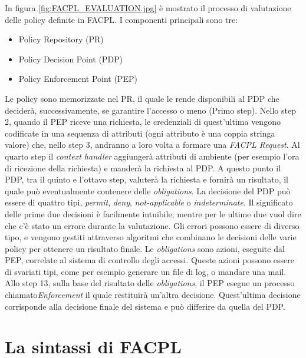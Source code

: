 In figura \ref{fig:FACPL_EVALUATION.jpg} è mostrato il processo di valutazione delle policy definite in FACPL.
I componenti principali sono tre:
\begin{itemize}
\item{Policy Repository (PR)}
\item{Policy Decision Point (PDP)}
\item{Policy Enforcement Point (PEP)}
\end{itemize}
Le policy sono memorizzate nel PR, il quale le rende disponibili al PDP che deciderà, successivamente, se garantire l'accesso o meno (Primo step).
Nello step 2, quando il PEP riceve una richiesta, le credenziali di quest'ultima vengono codificate in una sequenza di attributi (ogni attributo è una coppia stringa valore) che, nello step 3, andranno a loro volta a formare una \textit{FACPL Request}.
Al quarto step il \textit{context handler} aggiungerà attributi di ambiente (per esempio l'ora di ricezione della richiesta) e manderà la richiesta al PDP.
A questo punto il PDP, tra il quinto e l'ottavo step, valuterà la richiesta e fornirà un risultato, il quale può eventualmente contenere delle \textit{obligations}.
La decisione del PDP può essere di quattro tipi, \textit{permit}, \textit{deny}, \textit{not-applicable} o \textit{indeterminate}.
Il significato delle prime due decisioni è facilmente intuibile, mentre per le ultime due vuol dire che c'è stato un errore durante la valutazione.
Gli errori possono essere di diverso tipo, e vengono gestiti attraverso algoritmi che combinano le decisioni delle varie policy per ottenere un risultato finale.
Le \textit{obligations} sono azioni, eseguite dal PEP, correlate al sistema di controllo degli accessi. Queste azioni possono essere di svariati tipi, come per esempio generare un file di log, o mandare una mail.
Allo step 13, sulla base del risultato delle \textit{obligations}, il PEP esegue un processo chiamato\textit{Enforcement} il quale restituirà un'altra decisione.
Quest'ultima decisione corrisponde alla decisione finale del sistema e può differire da quella del PDP.


\section{La sintassi di FACPL}
\label{sec:facpl_syntax}



